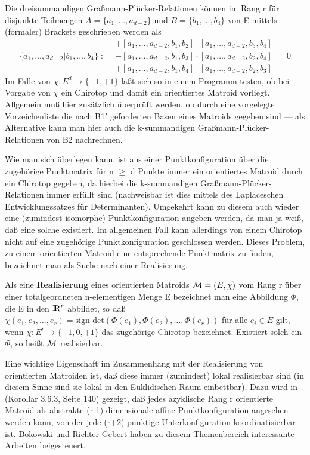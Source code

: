 Die dreisummandigen Graßmann-Plücker-Relationen können im Rang r für
disjunkte Teilmengen $A=\{a_1,\ldots,a_{d-2}\}$ und $B=\{b_1,\ldots,b_4\}$
von E mittels (formaler) Brackets geschrieben werden als
$$\{a_1,\ldots,a_{d-2}|b_1,\ldots,b_4\}:=
  \begin{array}{l}
    +[a_1,\ldots,a_{d-2},b_1,b_2]\cdot [a_1,\ldots,a_{d-2},b_3,b_4]\\
    -[a_1,\ldots,a_{d-2},b_1,b_3]\cdot [a_1,\ldots,a_{d-2},b_2,b_4]\\
    +[a_1,\ldots,a_{d-2},b_1,b_4]\cdot [a_1,\ldots,a_{d-2},b_2,b_3]
  \end{array}=0$$
Im Falle von $\chi:E^d\to\{-1,+1\}$ läßt sich so in einem Programm testen,
ob bei Vorgabe von $\chi$ ein Chirotop und damit ein orientiertes Matroid
vorliegt. Allgemein muß hier zusätzlich überprüft werden, ob durch eine
vorgelegte Vorzeichenliste die nach B1$'$ geforderten Basen eines Matroids
gegeben sind --- als Alternative kann man hier auch die k-summandigen
Graßmann-Plücker-Relationen von B2 nachrechnen.

Wie man sich überlegen kann, ist aus einer Punktkonfiguration über die
zugehörige Punktmatrix für n $\geq$ d Punkte immer ein orientiertes Matroid
durch ein Chirotop gegeben, da hierbei die k-summandigen
Graßmann-Plücker-Relationen immer erfüllt sind (nachweisbar ist dies mittels
des Laplaceschen Entwicklungssatzes für Determinanten). Umgekehrt kann
zu diesem auch wieder eine (zumindest isomorphe) Punktkonfiguration angeben
werden, da man ja weiß, daß eine solche existiert. Im allgemeinen Fall kann
allerdings von einem Chirotop nicht auf eine zugehörige Punktkonfiguration
geschlossen werden. Dieses Problem, zu einem orientierten Matroid eine
entsprechende Punktmatrix zu finden, bezeichnet man als Suche nach einer
Realisierung.\label{real}

Als eine {\bf Realisierung} eines orientierten Matroids
${\cal M}=(E,\chi)$ vom Rang r über einer totalgeordneten n-elementigen Menge
E bezeichnet man eine Abbildung $\Phi$, die E in den $\mbox{$\rm I\!R$}^r$ abbildet, so daß
$\chi(e_1,e_2,\ldots,e_r)=\mbox{sign det}(\Phi(e_1),\Phi(e_2),\ldots,\Phi(e_r))$
für alle $e_i\in E$ gilt, wenn $\chi:E^r\to\{-1,0,+1\}$ das zugehörige
Chirotop bezeichnet. Existiert solch ein $\Phi$, so heißt $\cal M$
realisierbar.

{\scsi
Eine wichtige Eigenschaft im Zusammenhang mit der Realisierung von
orientierten Matroiden ist, daß diese immer (zumindest) lokal realisierbar
sind (in diesem Sinne sind sie lokal in den Euklidischen Raum einbettbar). Dazu
wird in \cite{Bj:93} (Korollar 3.6.3, Seite 140) gezeigt, daß jedes azyklische
Rang r orientierte Matroid als abstrakte (r-1)-dimensionale affine
Punktkonfiguration angesehen werden kann, von der jede (r+2)-punktige
Unterkonfiguration koordinatisierbar ist. Bokowski und Richter-Gebert haben
zu diesem Themenbereich interessante Arbeiten beigesteuert.
}

